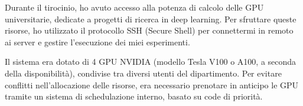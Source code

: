 Durante il tirocinio, ho avuto accesso alla potenza di calcolo delle GPU universitarie, dedicate a progetti di ricerca in deep learning. Per sfruttare queste risorse, ho utilizzato il protocollo SSH (Secure Shell) per connettermi in remoto ai server e gestire l’esecuzione dei miei esperimenti.

Il sistema era dotato di 4 GPU NVIDIA (modello Tesla V100 o A100, a seconda della disponibilità), condivise tra diversi utenti del dipartimento. Per evitare conflitti nell’allocazione delle risorse, era necessario prenotare in anticipo le GPU tramite un sistema di schedulazione interno, basato su code di priorità. 

